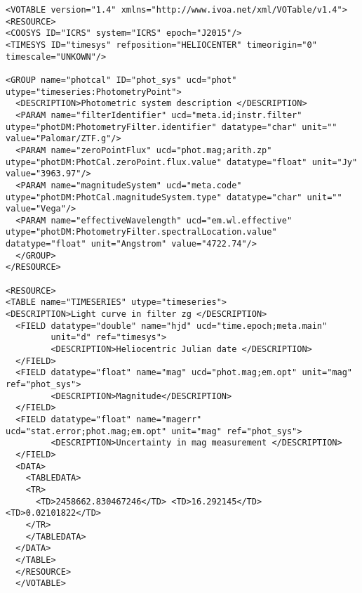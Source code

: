 \noindent
\begingroup\footnotesize
\begin{tcolorbox}
\begin{verbatim}
<VOTABLE version="1.4" xmlns="http://www.ivoa.net/xml/VOTable/v1.4">
<RESOURCE>
<COOSYS ID="ICRS" system="ICRS" epoch="J2015"/>
<TIMESYS ID="timesys" refposition="HELIOCENTER" timeorigin="0" timescale="UNKOWN"/>

<GROUP name="photcal" ID="phot_sys" ucd="phot" utype="timeseries:PhotometryPoint">
  <DESCRIPTION>Photometric system description </DESCRIPTION>
  <PARAM name="filterIdentifier" ucd="meta.id;instr.filter" utype="photDM:PhotometryFilter.identifier" datatype="char" unit="" value="Palomar/ZTF.g"/>
  <PARAM name="zeroPointFlux" ucd="phot.mag;arith.zp" utype="photDM:PhotCal.zeroPoint.flux.value" datatype="float" unit="Jy" value="3963.97"/>
  <PARAM name="magnitudeSystem" ucd="meta.code" utype="photDM:PhotCal.magnitudeSystem.type" datatype="char" unit="" value="Vega"/>
  <PARAM name="effectiveWavelength" ucd="em.wl.effective" utype="photDM:PhotometryFilter.spectralLocation.value" datatype="float" unit="Angstrom" value="4722.74"/>
  </GROUP>
</RESOURCE>

<RESOURCE>
<TABLE name="TIMESERIES" utype="timeseries">
<DESCRIPTION>Light curve in filter zg </DESCRIPTION>
  <FIELD datatype="double" name="hjd" ucd="time.epoch;meta.main"
         unit="d" ref="timesys">
         <DESCRIPTION>Heliocentric Julian date </DESCRIPTION>
  </FIELD>
  <FIELD datatype="float" name="mag" ucd="phot.mag;em.opt" unit="mag" ref="phot_sys">
         <DESCRIPTION>Magnitude</DESCRIPTION>
  </FIELD>
  <FIELD datatype="float" name="magerr" ucd="stat.error;phot.mag;em.opt" unit="mag" ref="phot_sys">
         <DESCRIPTION>Uncertainty in mag measurement </DESCRIPTION>
  </FIELD>
  <DATA>
    <TABLEDATA>
    <TR>
      <TD>2458662.830467246</TD> <TD>16.292145</TD> <TD>0.02101822</TD>
    </TR>
    </TABLEDATA>
  </DATA>
  </TABLE>
  </RESOURCE>
  </VOTABLE>

\end{verbatim}
\end{tcolorbox}
\endgroup

